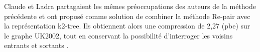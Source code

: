 
Claude et Ladra \citep{claude2011practical} partagaient les mêmes préoccupations des auteurs de la méthode précédente et ont proposé comme solution de combiner la méthode Re-pair avec la représentation k2-tree. Ils obtiennent alors une compression de 2,27 (pbe) sur le graphe UK2002, tout en conservant la possibilité d'interroger les voisins entrants et sortants \citep{maneth2015survey}.